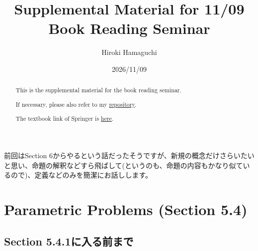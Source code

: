 \documentclass[12pt,dvipdfmx]{article}
\theoremstyle{plain}
\begin{document}
\title{Supplemental Material for 11/09\\Book Reading Seminar}
\author{Hiroki Hamaguchi}
\date{2026/11/09}
\maketitle

\begin{abstract}
    \begin{center}
        This is the supplemental material for the book reading seminar.

        If necessary, please also refer to my \href{https://github.com/hari64boli64/BookReadingSeminarMaterials}{repository}.

        The textbook link of Springer is \href{https://link.springer.com/book/10.1007/b97543}{here}.
    \end{center}
\end{abstract}

\noindent

前回はSection 6からやるという話だったそうですが、新規の概念だけさらいたいと思い、命題の解釈などすら飛ばして(というのも、命題の内容もかなり似ているので)、定義などのみを簡潔にお話しします。

\section{Parametric Problems (Section 5.4)}
\label{sec:parametric}


\subsection{Section 5.4.1に入る前まで}
\end{document}
